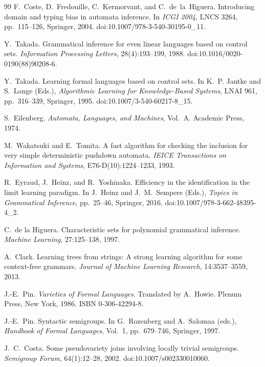\documentclass[11pt,a4paper]{article}
\theoremstyle{remark}
\theoremstyle{plain}
\begin{document}
\begin{thebibliography}{99}
F.~Coste, D.~Fredouille, C.~Kermorvant, and C.~de~la~Higuera.
\newblock Introducing domain and typing bias in automata inference.
\newblock In \textit{ICGI 2004}, LNCS 3264, pp.~115--126, Springer, 2004.
doi:10.1007/978-3-540-30195-0\_11.

Y.~Takada.
\newblock Grammatical inference for even linear languages based on control sets.
\newblock \textit{Information Processing Letters}, 28(4):193--199, 1988.
doi:10.1016/0020-0190(88)90208-6.

Y.~Takada.
\newblock Learning formal languages based on control sets.
\newblock In K.~P. Jantke and S.~Lange (Eds.), \textit{Algorithmic Learning
for Knowledge-Based Systems}, LNAI 961, pp.~316--339, Springer, 1995.
doi:10.1007/3-540-60217-8\_15.

S.~Eilenberg.
\newblock \emph{Automata, Languages, and Machines}, Vol.~A.
\newblock Academic Press, 1974.

M.~Wakatsuki and E.~Tomita.
\newblock A fast algorithm for checking the inclusion for very simple
deterministic pushdown automata.
\newblock \textit{IEICE Transactions on Information and Systems},
E76-D(10):1224--1233, 1993.

R.~Eyraud, J.~Heinz, and R.~Yoshinaka.
\newblock Efficiency in the identification in the limit learning paradigm.
\newblock In J.~Heinz and J.~M.~Sempere (Eds.),
\emph{Topics in Grammatical Inference}, pp.~25--46, Springer, 2016.
doi:10.1007/978-3-662-48395-4\_2.

C.~de la Higuera.
Characteristic sets for polynomial grammatical inference.
\textit{Machine Learning}, 27:125--138, 1997.

A.~Clark.
\newblock Learning trees from strings: A strong learning algorithm for some context-free grammars.
\newblock \textit{Journal of Machine Learning Research}, 14:3537--3559, 2013.

J.-E.~Pin.
\newblock \emph{Varieties of Formal Languages}.
\newblock Translated by A.~Howie.
\newblock Plenum Press, New York, 1986.
\newblock ISBN 0-306-42294-8.

J.-E.~Pin.
\newblock Syntactic semigroups.
\newblock In G.~Rozenberg and A.~Salomaa (eds.),
\textit{Handbook of Formal Languages}, Vol.~1, pp.~679--746,
Springer, 1997.

J.~C.~Costa.
\newblock Some pseudovariety joins involving locally trivial semigroups.
\newblock \textit{Semigroup Forum}, 64(1):12--28, 2002.
\newblock doi:10.1007/s002330010060.


\end{thebibliography}
\end{document}
